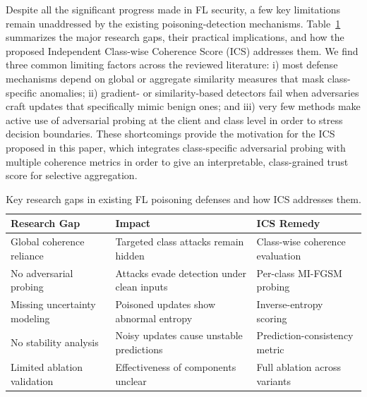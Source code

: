 \documentclass[conference]{IEEEtran}
\begin{document}
Despite all the significant progress made in FL security, a few key limitations remain unaddressed by the existing poisoning-detection mechanisms. Table~\ref{tab:gaps} summarizes the major research gaps, their practical implications, and how the proposed Independent Class-wise Coherence Score (ICS) addresses them.
We find three common limiting factors across the reviewed literature: 
i) most defense mechanisms depend on global or aggregate similarity measures that mask class-specific anomalies;
ii) gradient- or similarity-based detectors fail when adversaries craft updates that specifically mimic benign ones; 
and iii) very few methods make active use of adversarial probing at the client and class level in order to stress decision boundaries. These shortcomings provide the motivation for the ICS proposed in this paper, which integrates class-specific adversarial probing with multiple coherence metrics in order to give an interpretable, class-grained trust score for selective aggregation.

\begin{table}[!t]
\centering
\caption{Key research gaps in existing FL poisoning defenses and how ICS addresses them.}
\label{tab:gaps}
\setlength{\tabcolsep}{4pt}        %
\renewcommand{\arraystretch}{2} %
\small                             %
\begin{tabular}{p{2.6cm} p{2.8cm} p{2.6cm}}
\toprule
\textbf{Research Gap} & \textbf{Impact} & \textbf{ICS Remedy} \\
\midrule
Global coherence reliance
& Targeted class attacks remain hidden
& Class-wise coherence evaluation \\

No adversarial probing
& Attacks evade detection under clean inputs
& Per-class MI-FGSM probing \\

Missing uncertainty modeling
& Poisoned updates show abnormal entropy
& Inverse-entropy scoring \\

No stability analysis
& Noisy updates cause unstable predictions
& Prediction-consistency metric \\

Limited ablation validation
& Effectiveness of components unclear
& Full ablation across variants \\
\bottomrule
\end{tabular}
\end{table}
\end{document}
